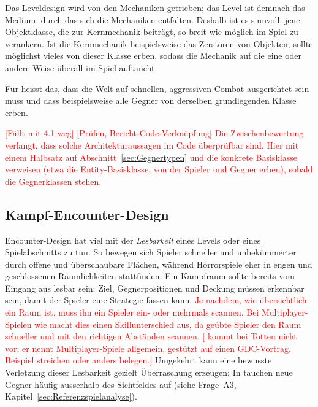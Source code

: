 \documentclass[../Main.tex]{subfiles}
\begin{document}
Das Leveldesign wird von den Mechaniken getrieben; das Level ist demnach das Medium, durch das sich die Mechaniken entfalten.\autocite{gdc_tenprinciples2010} Deshalb ist es sinnvoll, jene Objektklasse, die zur Kernmechanik beiträgt, so breit wie möglich im Spiel zu verankern. Ist die Kernmechanik beispielsweise das Zerstören von Objekten, sollte möglichst vieles von dieser Klasse erben, sodass die Mechanik auf die eine oder andere Weise überall im Spiel auftaucht.\autocite{gdc_movingmountains2020}

Für  heisst das, dass die Welt auf schnellen, aggressiven Combat ausgerichtet sein muss und dass beispielsweise alle Gegner von derselben grundlegenden Klasse erben.\endgroup

\textcolor{red}{[Fällt mit 4.1 weg] [Prüfen, Bericht-Code-Verknüpfung] Die Zwischenbewertung verlangt, dass solche Architekturaussagen im Code überprüfbar sind. Hier mit einem Halbsatz auf Abschnitt~\ref{sec:Gegnertypen} und die konkrete Basisklasse verweisen (etwa die Entity-Basisklasse, von der Spieler und Gegner erben), sobald die Gegnerklassen stehen.}

\subsection{Kampf-Encounter-Design} \label{sec:Encounter}
Encounter-Design hat viel mit der \textit{Lesbarkeit} eines Levels oder eines Spielabschnitts zu tun. So bewegen sich Spieler schneller und unbekümmerter durch offene und überschaubare Flächen, während Horrorspiele eher in engen und geschlossenen Räumlichkeiten stattfinden. Ein Kampfraum sollte bereits vom Eingang aus lesbar sein: Ziel, Gegnerpositionen und Deckung müssen erkennbar sein, damit der Spieler eine Strategie fassen kann.\autocite{gdc_horizonquests2018} \textcolor{red}{Je nachdem, wie übersichtlich ein Raum ist, muss ihn ein Spieler ein- oder mehrmals scannen. Bei Multiplayer-Spielen wie \autocite{valve_counterstrike_2000} macht dies einen Skillunterschied aus, da geübte Spieler den Raum schneller und mit den richtigen Abständen scannen.\autocite[122--123]{totten2014architectural} \textcolor{red}{[ kommt bei Totten nicht vor; er nennt Multiplayer-Spiele allgemein, gestützt auf einen GDC-Vortrag. Beispiel streichen oder anders belegen.]}} Umgekehrt kann eine bewusste Verletzung dieser Lesbarkeit gezielt Überraschung erzeugen: In  tauchen neue Gegner häufig ausserhalb des Sichtfeldes auf (siehe Frage~A3, Kapitel~\ref{sec:Referenzspielanalyse}).
\end{document}

